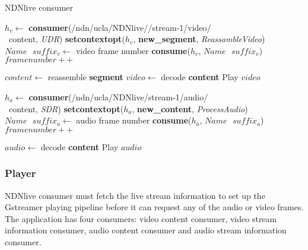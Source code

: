 \begin{algorithm}[hbt]
\caption{NDNlive consumer}
\label{alg:liveconsumer}
\begin{algorithmic}[2]
\State $h_v \leftarrow $ \textbf{consumer}(/ndn/ucla/NDNlive//stream-1/video/\\\ content, \textit{UDR})
\State \textbf{setcontextopt}($h_v$, \textbf{new\_segment}, \textit{ReassambleVideo})
\vspace{0.2cm}
	\State $Name \textbf{ } suffix_v \leftarrow $ video frame number
	\State \textbf{consume}($h_v$, $Name\textbf{ }suffix_v$)
	\State $framenumber ++$
	\EndWhile
\vspace{0.2cm}

    \State $content \leftarrow $ reassemble \textbf{segment}
		\State $video \leftarrow $ decode \textbf{content}
	   	\State Play $video$
	\EndIf
\EndFunction

\vspace{0.4cm}

\State $h_a \leftarrow $ \textbf{consumer}(/ndn/ucla/NDNlive/stream-1/audio/\\\ content, \textit{SDR})
\State \textbf{setcontextopt}($h_a$, \textbf{new\_content}, \textit{ProcessAudio})
\vspace{0.2cm}
	\State $Name \textbf{ } suffix_a \leftarrow $ audio frame number
	\State \textbf{consume}($h_a$, $Name\textbf{ }suffix_a$)
	\State $framenumber ++$
	\EndWhile
\vspace{0.2cm}

   	\State $audio \leftarrow $ decode \textbf{content}
   	\State Play $audio$
\EndFunction
\end{algorithmic}
\end{algorithm}

\subsubsection{Player}
\label{ssub:NDNlive_con}
NDNlive consumer must fetch the live stream information to set up the Gstreamer playing pipeline before it can request any of the audio or video frames. The application has four consumers: video content consumer, video stream information consumer, audio content consumer and audio stream information consumer. 

